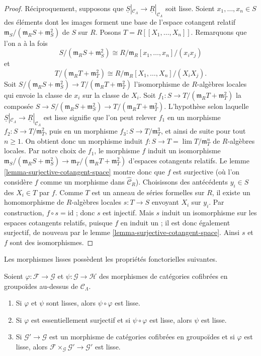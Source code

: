 \begin{proof}
\medskip\noindent
Réciproquement, supposons que
$\underline{S}|_{\mathcal{C}_\Lambda} \to \underline{R}|_{\mathcal{C}_\Lambda}$
soit lisse. Soient $x_1, \ldots, x_n \in S$ des éléments dont les images
forment une base de l'espace cotangent relatif
$\mathfrak m_S/(\mathfrak m_R S + \mathfrak m_S^2)$ de $S$ sur $R$.
Posons $T = R[[X_1, \ldots, X_n]]$. Remarquons que l'on a à la fois
$$
S/(\mathfrak m_R S + \mathfrak m_S^2) \cong
R/\mathfrak m_R[x_1, \ldots, x_n]/(x_ix_j)
$$
et
$$
T/(\mathfrak m_R T + \mathfrak m_T^2) \cong
R/\mathfrak m_R[X_1, \ldots, X_n]/(X_iX_j).
$$
Soit
$S/(\mathfrak m_R S + \mathfrak m_S^2) \to
T/(\mathfrak m_R T + \mathfrak m_T^2)$
l'isomorphisme de $R$-algèbres locales qui envoie la classe de $x_i$ sur la
classe de $X_i$. Soit
$f_1 : S \to T/(\mathfrak m_R T + \mathfrak m_T^2)$ la composée
$S \to S/(\mathfrak m_R S + \mathfrak m_S^2)
\to T/(\mathfrak m_R T + \mathfrak m_T^2)$.
L'hypothèse selon laquelle
$\underline{S}|_{\mathcal{C}_\Lambda} \to \underline{R}|_{\mathcal{C}_\Lambda}$
est lisse signifie que l'on peut relever $f_1$ en un morphisme
$f_2 : S \to T/\mathfrak{m}_T^2$, puis en un morphisme
$f_3 : S \to T/\mathfrak{m}_T^3$, et ainsi de suite pour tout $n \geq 1$.
On obtient donc un morphisme induit $f : S \to T = \lim T/\mathfrak m_T^n$
de $R$-algèbres locales. Par notre choix de $f_1$, le morphisme $f$ induit
un isomorphisme
$\mathfrak m_S/(\mathfrak m_R S + \mathfrak m_S^2) \to
\mathfrak m_T/(\mathfrak m_R T + \mathfrak m_T^2)$
d'espaces cotangents relatifs. Le lemme
\ref{lemma-surjective-cotangent-space} montre donc que $f$ est surjective
(où l'on considère $f$ comme un morphisme dans
$\widehat{\mathcal{C}}_R$). Choisissons des antécédents $y_i \in S$ des
$X_i \in T$ par $f$. Comme $T$ est un anneau de séries formelles sur $R$, il
existe un homomorphisme de $R$-algèbres locales $s : T \to S$ envoyant $X_i$
sur $y_i$. Par construction, $f \circ s = \text{id}$ ; donc $s$ est
injectif. Mais $s$ induit un isomorphisme sur les espaces cotangents relatifs,
puisque $f$ en induit un ; il est donc également surjectif, de nouveau par le
lemme \ref{lemma-surjective-cotangent-space}. Ainsi $s$ et $f$ sont des
isomorphismes.
\end{proof}

\noindent
Les morphismes lisses possèdent les propriétés fonctorielles suivantes.

\begin{lemma}
\label{lemma-smooth-properties}
Soient $\varphi : \mathcal{F} \to \mathcal{G}$ et $\psi : \mathcal{G}
\to \mathcal{H}$ des morphismes de catégories cofibrées en groupoïdes
au-dessus de $\mathcal{C}_\Lambda$.
\begin{enumerate}
\item Si $\varphi$ et $\psi$ sont lisses, alors $\psi \circ \varphi$ est
lisse.
\item Si $\varphi$ est essentiellement surjectif et si
$\psi \circ \varphi$ est lisse, alors $\psi$ est lisse.
\item Si $\mathcal{G}' \to \mathcal{G}$ est un morphisme de catégories
cofibrées en groupoïdes et si $\varphi$ est lisse, alors
$\mathcal{F} \times_\mathcal{G} \mathcal{G}' \to \mathcal{G}'$ est lisse.
\end{enumerate}
\end{lemma}

